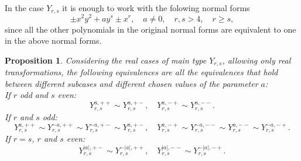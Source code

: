 \documentclass[noend]{amsproc}
\newtheorem{prop}[theorem]{Proposition}
\theoremstyle{definition}
\begin{document}
In the case $Y_{r,s}$ it is enough to work with the folowing normal forms
\[\pm x^2y^2+ay^s\pm x^r,\quad a\neq 0,\quad r,s>4,\quad r\ge s,\]
since all the other polynomials in the original normal forms are equivalent to one in the above normal forms.

\begin{prop}\label{Yrs}
Considering the real cases of main type $Y_{r,s}$, allowing only real transformations, the following equivalences are all the equivalences that hold between different subcases and different chosen values of the parameter $a$:\\
If $r$ odd and $s$ even:
\[Y_{r,s}^{a,++}\sim Y_{r,s}^{a,+-},\quad Y_{r,s}^{a,-+}\sim Y_{r,s}^{a,--}.\]
If $r$ and $s$ odd:
\[Y_{r,s}^{a,++}\sim Y_{r,s}^{-a,++}\sim Y_{r,s}^{-a,+-}\sim Y_{r,s}^{a,+-},\quad Y_{r,s}^{a,-+}\sim Y_{r,s}^{-a,--}\sim Y_{r,s}^{a,--}\sim Y_{r,s}^{-a,-+}.\]
If $r=s$, $r$ and $s$ even:
\[Y_{r,s}^{|a|,+-}\sim Y_{r,s}^{-|a|,++},\quad Y_{r,s}^{|a|,--}\sim Y_{r,s}^{-|a|,-+}.\]
\end{prop}
\end{document}
